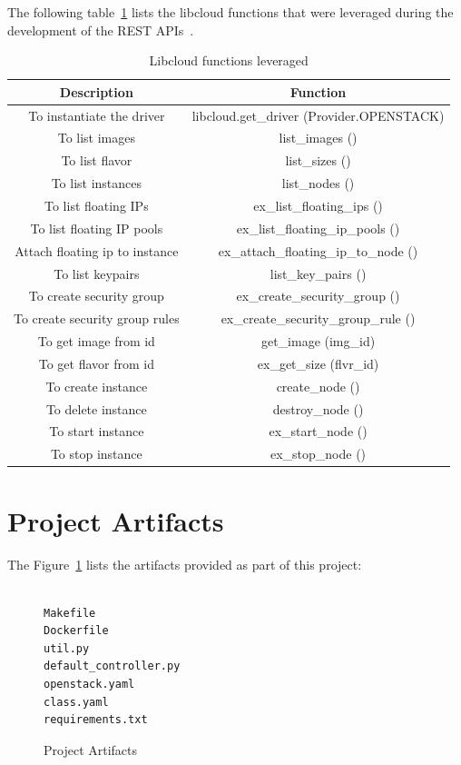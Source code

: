 The following table~\ref{tab:Description} lists the libcloud functions that 
were leveraged during the development of the REST 
APIs~\cite{hid-sp18-516-www-libcloud-functions}. 

\begin{table}[]
\centering
\caption{Libcloud functions leveraged}\label{tab:Description}
\begin{tabular}{*{2}{c}}
\toprule
Description                      & Function \\
\midrule
To instantiate the driver        & libcloud.get\_driver (Provider.OPENSTACK) \\
To list images                   & list\_images () \\
To list flavor                   & list\_sizes () \\
To list instances                & list\_nodes () \\
To list floating IPs             & ex\_list\_floating\_ips () \\
To list floating IP pools        & ex\_list\_floating\_ip\_pools () \\
Attach floating ip to instance   & ex\_attach\_floating\_ip\_to\_node () \\
To list keypairs                 & list\_key\_pairs () \\
To create security group         & ex\_create\_security\_group () \\
To create security group rules   & ex\_create\_security\_group\_rule () \\
To get image from id 	         & get\_image (img\_id) \\
To get flavor from id            & ex\_get\_size (flvr\_id) \\
To create instance               & create\_node () \\
To delete instance               & destroy\_node () \\
To start instance                & ex\_start\_node () \\
To stop instance                 & ex\_stop\_node () \\
\bottomrule
\end{tabular}
\end{table}

\section{Project Artifacts}

The Figure~\ref{c:project-artifacts} lists the artifacts provided as part of
this project:
\begin{figure}[htb]
\begin{verbatim}

Makefile
Dockerfile
util.py
default_controller.py
openstack.yaml
class.yaml
requirements.txt
\end{verbatim}
\caption{Project Artifacts}\label{c:project-artifacts}
\end{figure}


